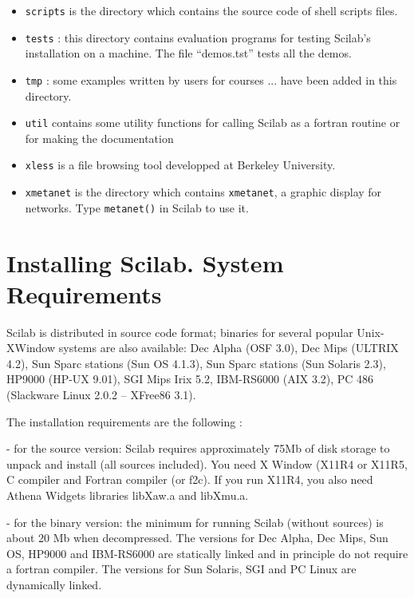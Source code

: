 \begin{itemize}
\item{{\tt scripts} is the directory which contains the source code of 
shell scripts files.}

\item{{\tt tests} : this directory contains evaluation programs for testing 
Scilab's installation on a machine. The file ``demos.tst'' tests all the 
demos.}

\item{{\tt tmp} : some examples written by users for courses ... have been
added in this directory. }

\item{{\tt util} contains some utility functions for calling Scilab as a
fortran routine or for making the documentation }

\item{{\tt xless} is a file browsing tool developped at Berkeley University.}

\item{{\tt xmetanet} is the directory which contains {\tt xmetanet}, a 
graphic display for networks. Type {\tt metanet()} in Scilab to use it.}


\end{itemize}

\section{Installing Scilab. System Requirements}
\label{install}
Scilab is distributed in source code format; binaries for several popular 
Unix-XWindow systems are also available:
Dec Alpha (OSF 3.0), Dec Mips (ULTRIX 4.2), Sun Sparc stations (Sun OS 4.1.3), 
Sun Sparc stations (Sun Solaris 2.3), HP9000 (HP-UX 9.01),
SGI Mips Irix 5.2, IBM-RS6000 (AIX 3.2), PC 486 (Slackware Linux 2.0.2 -- XFree86 3.1). 

The installation requirements are the following :

- for the source version: Scilab requires approximately 75Mb of 
disk storage to unpack and install (all sources included). 
You need X Window (X11R4 or X11R5, C compiler and Fortran
compiler (or f2c). If you run X11R4, you also need Athena 
Widgets libraries libXaw.a and libXmu.a.
  
- for the binary version: the minimum for running Scilab (without
sources) is about 20 Mb when decompressed.
The versions for Dec Alpha, Dec Mips, Sun OS, HP9000 and 
IBM-RS6000 are statically linked and in principle
do not require a fortran compiler.
The versions for Sun Solaris, SGI and PC Linux are dynamically linked.

